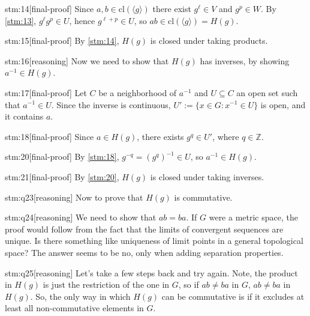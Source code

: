 \documentclass{article}
\begin{document}
\begin{stm}{stm:14}[final-proof]
Since $a,b \in \mathrm{cl}({\langle g \rangle})$ there exist $g^\ell \in V$ and $g^p \in W$. By \ref{stm:13}, $g^\ell g^p \in U$, hence $g^{\ell+p} \in U$, so $ab \in \mathrm{cl}({\langle g \rangle}) = H(g)$.
\end{stm}

\begin{stm}{stm:15}[final-proof]
By \ref{stm:14}, $H(g)$ is closed under taking products.
\end{stm}

\begin{stm}{stm:16}[reasoning]
Now we need to show that $H(g)$ has inverses, by showing $a^{-1} \in H(g)$.
\end{stm}

\begin{stm}{stm:17}[final-proof]
Let $C$ be a neighborhood of $a^{-1}$ and $U \subseteq C$ an open set such that $a^{-1} \in U$. Since the inverse is continuous, $U' := \{x \in G : x^{-1} \in U\}$ is open, and it contains $a$.
\end{stm}

\begin{stm}{stm:18}[final-proof]
Since $a \in H(g)$, there exists $g^q \in U'$, where $q \in \mathbb{Z}$.
\end{stm}

\begin{stm}{stm:20}[final-proof]
By \ref{stm:18}, $g^{-q} = (g^q)^{-1} \in U$, so $a^{-1} \in H(g)$.
\end{stm}

\begin{stm}{stm:21}[final-proof]
By \ref{stm:20}, $H(g)$ is closed under taking inverses.
\end{stm}

\begin{stm}{stm:q23}[reasoning]
Now to prove that $H(g)$ is commutative.
\end{stm}

\begin{stm}{stm:q24}[reasoning]
We need to show that $ab = ba$. If $G$ were a metric space, the proof would follow from the fact that the limits of convergent sequences are unique. Is there something like uniqueness of limit points in a general topological space? The answer seems to be no, only when adding separation properties.
\end{stm}

\begin{stm}{stm:q25}[reasoning]
Let’s take a few steps back and try again. Note, the product in $H(g)$ is just the restriction of the one in $G$, so if $ab \ne ba$ in $G$, $ab \ne ba$ in $H(g)$. So, the only way in which $H(g)$ can be commutative is if it excludes at least all non-commutative elements in $G$.
\end{stm}
\end{document}
